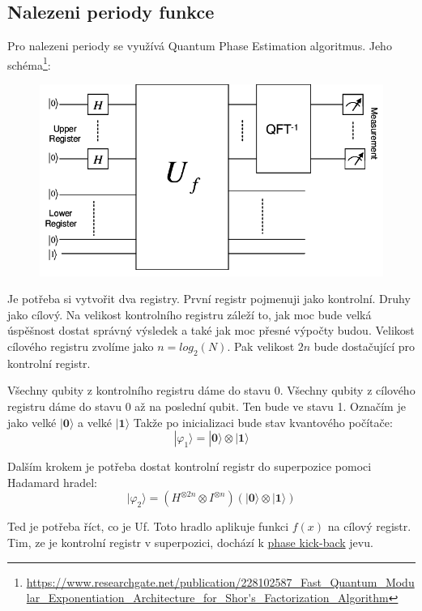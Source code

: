 \documentclass[11pt]{article}
\begin{document}
\subsection{Nalezeni periody funkce}
Pro nalezeni periody se využívá Quantum Phase Estimation algoritmus.
Jeho schéma\footnote{\sloppy\url{https://www.researchgate.net/publication/228102587_Fast_Quantum_Modular_Exponentiation_Architecture_for_Shor's_Factorization_Algorithm}}:
\begin{figure}[H]
    \includegraphics[scale=.5]{High-level-diagram-of-Shors-algorithm-Upper-register-consists-of-2n-qubits-and-holds}
    \centering
\end{figure}
\par Je potřeba si vytvořit dva registry. První registr pojmenuji jako kontrolní. Druhy jako cílový.
Na velikost kontrolního registru záleží to, jak moc bude velká úspěšnost dostat správný výsledek a také jak moc přesné výpočty budou.
Velikost cílového registru zvolíme jako $n = log_2(N)$.
Pak velikost $2n$ bude dostačující pro kontrolní registr.
\par Všechny qubity z kontrolního registru dáme do stavu $0$. Všechny qubity z cílového registru dáme do stavu $0$ až na poslední qubit. Ten bude ve stavu 1.
Označím je jako velké $|\textbf{0}\rangle$ a velké $|\textbf{1}\rangle$
Takže po inicializaci bude stav kvantového počítače:
$$|\varphi_1\rangle = |\textbf{0}\rangle\otimes|\textbf{1}\rangle$$
\par Dalším krokem je potřeba dostat kontrolní registr do superpozice pomoci Hadamard hradel:
$$|\varphi_2\rangle = (H^{\otimes 2n}\otimes I^{\otimes n})(|\textbf{0}\rangle\otimes|\textbf{1}\rangle)$$
\par Ted je potřeba říct, co je Uf. Toto hradlo aplikuje funkci $f(x)$ na cílový registr.
Tim, ze je kontrolní registr v superpozici, dochází k \hyperref[sec:phase_kickback]{phase kick-back} jevu.
\end{document}
